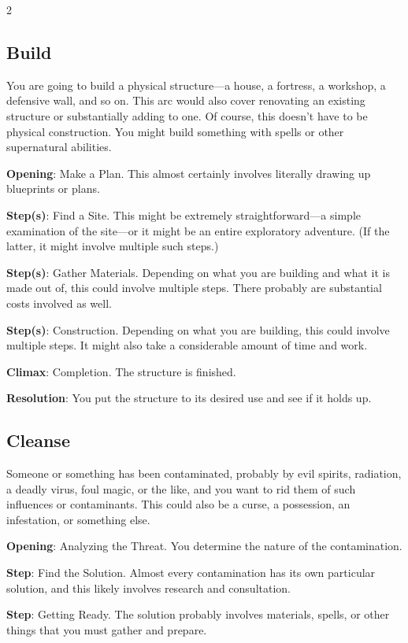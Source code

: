 \begin{multicols}{2}
\subsection{Build}

You are going to build a physical structure—a house, a fortress, a workshop, a defensive wall, and so on. This arc would also cover renovating an existing structure or substantially adding to one. Of course, this doesn’t have to be physical construction. You might build something with spells or other supernatural abilities.

\textbf{Opening}: Make a Plan. This almost certainly involves literally drawing up blueprints or plans.

\textbf{Step(s)}: Find a Site. This might be extremely straightforward—a simple examination of the site—or it might be an entire exploratory adventure. (If the latter, it might involve multiple such steps.)

\textbf{Step(s)}: Gather Materials. Depending on what you are building and what it is made out of, this could involve multiple steps. There probably are substantial costs involved as well.

\textbf{Step(s)}: Construction. Depending on what you are building, this could involve multiple steps. It might also take a considerable amount of time and work.

\textbf{Climax}: Completion. The structure is finished. 

\textbf{Resolution}: You put the structure to its desired use and see if it holds up.

\subsection{Cleanse}

Someone or something has been contaminated, probably by evil spirits, radiation, a deadly virus, foul magic, or the like, and you want to rid them of such influences or contaminants. This could also be a curse, a possession, an infestation, or something else.

\textbf{Opening}: Analyzing the Threat. You determine the nature of the contamination.

\textbf{Step}: Find the Solution. Almost every contamination has its own particular solution, and this likely involves research and consultation.

\textbf{Step}: Getting Ready. The solution probably involves materials, spells, or other things that you must gather and prepare.


\end{multicols}
